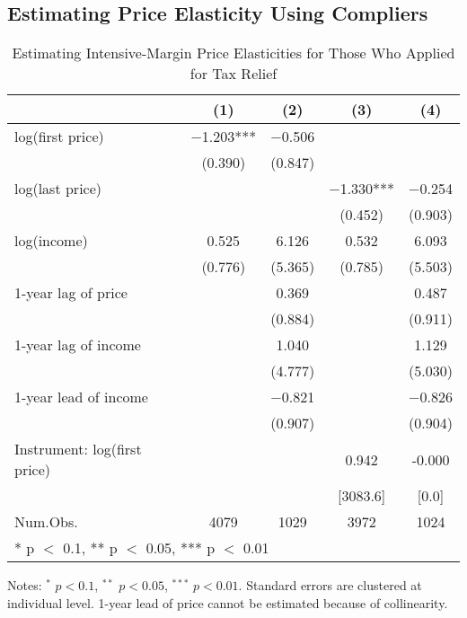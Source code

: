 \documentclass[
  11pt,
  a4paper,
]{article}
\begin{document}
\hypertarget{estimating-price-elasticity-using-compliers}{%
\subsection{Estimating Price Elasticity Using Compliers}\label{estimating-price-elasticity-using-compliers}}

\begin{table}

\caption{\label{tab:R1Elasticity}Estimating Intensive-Margin Price Elasticities for Those Who Applied for Tax Relief}
\centering
\fontsize{5}{7}\selectfont
\begin{threeparttable}
\begin{tabular}[t]{lcccc}
\toprule
  & (1) & (2) & (3) & (4)\\
\midrule
log(first price) & \num{-1.203}*** & \num{-0.506} &  & \\
 & (\num{0.390}) & (\num{0.847}) &  & \\
log(last price) &  &  & \num{-1.330}*** & \num{-0.254}\\
 &  &  & (\num{0.452}) & (\num{0.903})\\
log(income) & \num{0.525} & \num{6.126} & \num{0.532} & \num{6.093}\\
 & (\num{0.776}) & (\num{5.365}) & (\num{0.785}) & (\num{5.503})\\
1-year lag of price &  & \num{0.369} &  & \num{0.487}\\
 &  & (\num{0.884}) &  & (\num{0.911})\\
1-year lag of income &  & \num{1.040} &  & \num{1.129}\\
 &  & (\num{4.777}) &  & (\num{5.030})\\
1-year lead of income &  & \num{-0.821} &  & \num{-0.826}\\
 &  & (\num{0.907}) &  & (\num{0.904})\\
\midrule
Instrument: log(first price) &  &  & 0.942 & -0.000\\
 &  &  & {}[3083.6] & {}[0.0]\\
Num.Obs. & \num{4079} & \num{1029} & \num{3972} & \num{1024}\\
\bottomrule
\multicolumn{5}{l}{\rule{0pt}{1em}* p $<$ 0.1, ** p $<$ 0.05, *** p $<$ 0.01}\\
\end{tabular}
\begin{tablenotes}
\item Notes: $^{*}$ $p < 0.1$, $^{**}$ $p < 0.05$, $^{***}$ $p < 0.01$. Standard errors are clustered at individual level. 1-year lead of price cannot be estimated because of collinearity.
\end{tablenotes}
\end{threeparttable}
\end{table}
\end{document}
